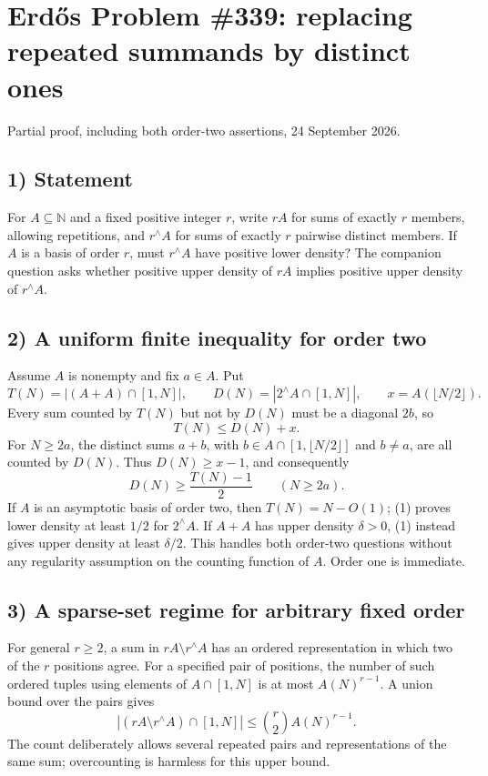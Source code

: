 \section{Erd\H{o}s Problem \#339: replacing repeated summands by distinct ones}
\noindent Partial proof, including both order-two assertions, 24 September 2026.

\subsection*{1) Statement}
For $A\subseteq\mathbb N$ and a fixed positive integer $r$, write $rA$ for sums of exactly $r$ members, allowing repetitions, and $r^{\wedge}A$ for sums of exactly $r$ pairwise distinct members. If $A$ is a basis of order $r$, must $r^{\wedge}A$ have positive lower density? The companion question asks whether positive upper density of $rA$ implies positive upper density of $r^{\wedge}A$.

\subsection*{2) A uniform finite inequality for order two}
Assume $A$ is nonempty and fix $a\in A$. Put
\[T(N)=|(A+A)\cap[1,N]|,\qquad D(N)=|2^{\wedge}A\cap[1,N]|,\qquad x=A(\lfloor N/2\rfloor).
\]
Every sum counted by $T(N)$ but not by $D(N)$ must be a diagonal $2b$, so
\[T(N)\le D(N)+x.
\]
For $N\ge2a$, the distinct sums $a+b$, with $b\in A\cap[1,\lfloor N/2\rfloor]$ and $b\ne a$, are all counted by $D(N)$. Thus $D(N)\ge x-1$, and consequently
\[D(N)\ge\frac{T(N)-1}{2}\qquad(N\ge2a).\tag{1}\]
If $A$ is an asymptotic basis of order two, then $T(N)=N-O(1)$; (1) proves lower density at least $1/2$ for $2^{\wedge}A$. If $A+A$ has upper density $\delta>0$, (1) instead gives upper density at least $\delta/2$. This handles both order-two questions without any regularity assumption on the counting function of $A$. Order one is immediate.

\subsection*{3) A sparse-set regime for arbitrary fixed order}
For general $r\ge2$, a sum in $rA\setminus r^{\wedge}A$ has an ordered representation in which two of the $r$ positions agree. For a specified pair of positions, the number of such ordered tuples using elements of $A\cap[1,N]$ is at most $A(N)^{r-1}$. A union bound over the pairs gives
\[|(rA\setminus r^{\wedge}A)\cap[1,N]|\le\binom r2 A(N)^{r-1}.\tag{2}\]
The count deliberately allows several repeated pairs and representations of the same sum; overcounting is harmless for this upper bound.

